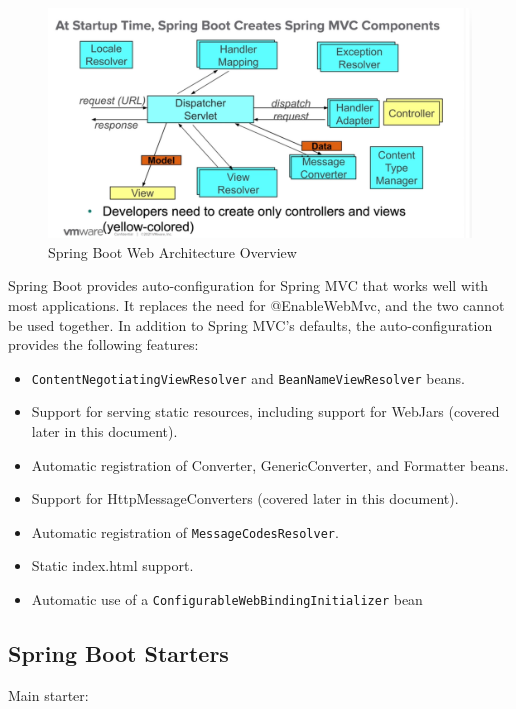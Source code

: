 \documentclass{scrartcl}
\begin{document}
\begin{figure}[h]
    \centering
    \includegraphics[width=1\linewidth]{spring-web}
    \caption{Spring Boot Web Architecture Overview}
    \label{fig:spring-web}
\end{figure}

Spring Boot provides auto-configuration for Spring MVC that works well with most applications. It replaces the need for @EnableWebMvc, and the two cannot be used together. In addition to Spring MVC’s defaults, the auto-configuration provides the following features:

\begin{itemize}
    \item \lstinline|ContentNegotiatingViewResolver| and \lstinline|BeanNameViewResolver| beans.
    \item Support for serving static resources, including support for WebJars (covered later in this document).
    \item Automatic registration of Converter, GenericConverter, and Formatter beans.
    \item Support for HttpMessageConverters (covered later in this document).
    \item Automatic registration of \lstinline|MessageCodesResolver|.
    \item Static index.html support.
    \item Automatic use of a \lstinline|ConfigurableWebBindingInitializer| bean
\end{itemize}

\subsection{Spring Boot Starters}

Main starter:
\end{document}
